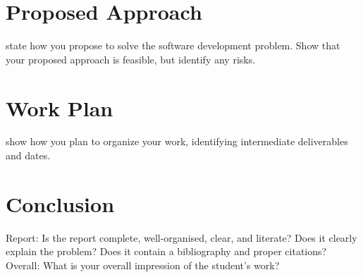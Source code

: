 \documentclass{mprop}
\begin{document}
\section{Proposed Approach}

state how you propose to solve the software development problem. Show that your proposed approach is feasible, but identify any risks.

\section{Work Plan}

show how you plan to organize your work, identifying intermediate deliverables and dates.

\section{Conclusion}

Report: Is the report complete, well-organised, clear, and literate? Does it clearly explain the problem? Does it contain a bibliography and proper citations?
Overall: What is your overall impression of the student’s work?



\end{document}
